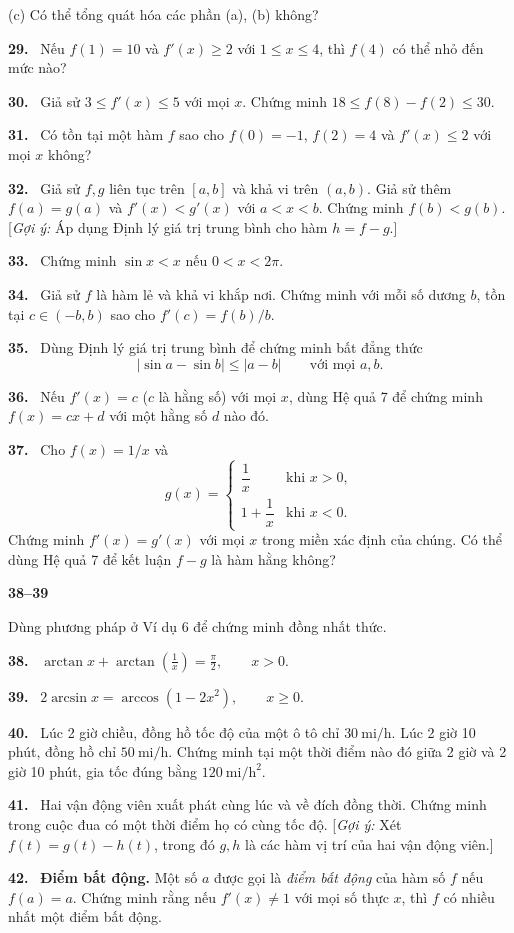 \documentclass[12pt,a4paper]{article}
\newcommand{\bt}[1]{\par\smallskip\Needspace{5\baselineskip}\noindent\textbf{#1.}\ }
\newcommand{\group}[1]{\par\medskip\noindent\textbf{#1}\par\nopagebreak[4]}
\begin{document}
(c) Có thể tổng quát hóa các phần (a), (b) không?
\bt{29} Nếu $f(1)=10$ và $f'(x)\ge2$ với $1\le x\le4$, thì $f(4)$ có thể nhỏ đến mức nào?
\bt{30} Giả sử $3\le f'(x)\le5$ với mọi $x$. Chứng minh $18\le f(8)-f(2)\le30$.
\bt{31} Có tồn tại một hàm $f$ sao cho $f(0)=-1$, $f(2)=4$ và $f'(x)\le2$ với mọi $x$ không?
\bt{32} Giả sử $f,g$ liên tục trên $[a,b]$ và khả vi trên $(a,b)$. Giả sử thêm $f(a)=g(a)$ và $f'(x)<g'(x)$ với $a<x<b$. Chứng minh $f(b)<g(b)$. [\textit{Gợi ý:} Áp dụng Định lý giá trị trung bình cho hàm $h=f-g$.]
\bt{33} Chứng minh $\sin x<x$ nếu $0<x<2\pi$.
\bt{34} Giả sử $f$ là hàm lẻ và khả vi khắp nơi. Chứng minh với mỗi số dương $b$, tồn tại $c\in(-b,b)$ sao cho $f'(c)=f(b)/b$.
\bt{35} Dùng Định lý giá trị trung bình để chứng minh bất đẳng thức
\[|\sin a-\sin b|\le|a-b|\qquad\text{với mọi }a,b.\]
\bt{36} Nếu $f'(x)=c$ ($c$ là hằng số) với mọi $x$, dùng Hệ quả 7 để chứng minh $f(x)=cx+d$ với một hằng số $d$ nào đó.
\bt{37} Cho $f(x)=1/x$ và
\[g(x)=\begin{cases}\dfrac1x&\text{khi }x>0,\\1+\dfrac1x&\text{khi }x<0.\end{cases}\]
Chứng minh $f'(x)=g'(x)$ với mọi $x$ trong miền xác định của chúng. Có thể dùng Hệ quả 7 để kết luận $f-g$ là hàm hằng không?
\group{38–39} Dùng phương pháp ở Ví dụ 6 để chứng minh đồng nhất thức.
\bt{38} $\displaystyle\arctan x+\arctan\left(\frac1x\right)=\frac\pi2,\qquad x>0$.
\bt{39} $\displaystyle2\arcsin x=\arccos(1-2x^2),\qquad x\ge0$.
\bt{40} Lúc 2 giờ chiều, đồng hồ tốc độ của một ô tô chỉ $30\ \mathrm{mi/h}$. Lúc 2 giờ 10 phút, đồng hồ chỉ $50\ \mathrm{mi/h}$. Chứng minh tại một thời điểm nào đó giữa 2 giờ và 2 giờ 10 phút, gia tốc đúng bằng $120\ \mathrm{mi/h^2}$.
\bt{41} Hai vận động viên xuất phát cùng lúc và về đích đồng thời. Chứng minh trong cuộc đua có một thời điểm họ có cùng tốc độ. [\textit{Gợi ý:} Xét $f(t)=g(t)-h(t)$, trong đó $g,h$ là các hàm vị trí của hai vận động viên.]
\bt{42} \textbf{Điểm bất động.} Một số $a$ được gọi là \textit{điểm bất động} của hàm số $f$ nếu $f(a)=a$. Chứng minh rằng nếu $f'(x)\ne1$ với mọi số thực $x$, thì $f$ có nhiều nhất một điểm bất động.
\end{document}
